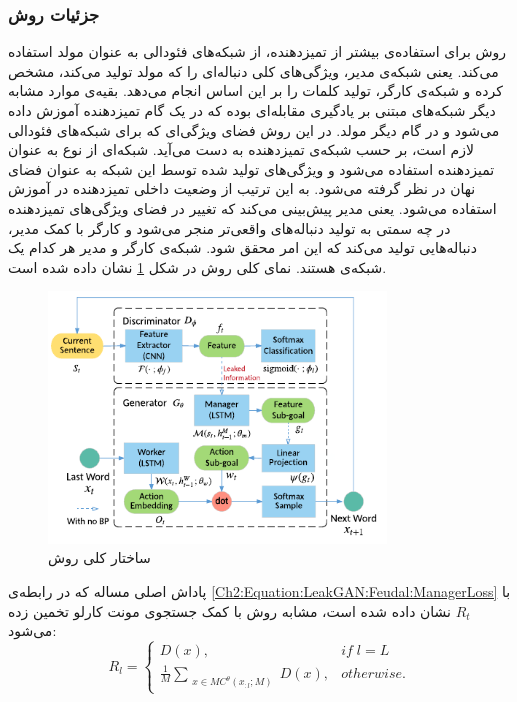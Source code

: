 \subsubsection{جزئیات روش}
روش
\cite{Guo2018}
برای استفاده‌ی بیشتر از تمیزدهنده، از شبکه‌های فئودالی به عنوان مولد استفاده می‌کند. یعنی شبکه‌ی مدیر، ویژگی‌های کلی دنباله‌ای را که مولد تولید می‌کند، مشخص کرده و شبکه‌ی کارگر، تولید کلمات را بر این اساس انجام می‌دهد.  بقیه‌ی موارد مشابه دیگر شبکه‌های مبتنی بر یادگیری مقابله‌ای بوده که در یک گام تمیزدهنده آموزش داده می‌شود و در گام دیگر مولد.
\newline
در این روش فضای ویژگی‌ای که برای شبکه‌های فئودالی لازم است، بر حسب شبکه‌ی تمیزدهنده به دست می‌آید. شبکه‌ای از نوع
به عنوان تمیزدهنده استفاده می‌شود  و ویژگی‌های تولید شده توسط این شبکه به عنوان فضای نهان در نظر گرفته می‌شود. به این ترتیب از وضعیت داخلی تمیزدهنده در آموزش استفاده می‌شود. یعنی مدیر پیش‌بینی می‌کند که تغییر در فضای ویژگی‌های تمیزدهنده در چه سمتی به تولید دنباله‌های واقعی‌تر منجر می‌شود و کارگر با کمک مدیر، دنباله‌هایی تولید می‌کند که این امر محقق شود.
شبکه‌ی کارگر و مدیر هر کدام یک شبکه‌ی 
هستند.
نمای کلی روش در شکل
\ref{Figure:LeakGAN:Architecture}
نشان داده شده است.
  \begin{figure}[!htb]
  	\centering
  	\includegraphics[width=0.8\textwidth]{images/ArchitectureLeakGAN.pdf} 
  	\caption[ساختار کلی روش 
  	]{
  		ساختار کلی روش 
  		\cite{Guo2018}
  	}
  	\label{Figure:LeakGAN:Architecture}
  \end{figure}
  \newline
پاداش اصلی مساله که در رابطه‌ی 
\ref{Ch2:Equation:LeakGAN:Feudal:ManagerLoss}
با
$R_t$
نشان داده شده است، مشابه روش
با کمک جستجوی مونت کارلو تخمین زده می‌شود:
 \begin{equation}\label{Ch2:Eqauation:Method:LeakGAN:RewardDefine}
R_l = 
 \begin{cases}
 D(x)  ,&   if \; l = L\\
 \frac{1}{M} \sum_{\substack{x \in MC^{\theta}(x_{:l}; M)}}D(x) ,&  otherwise .
 \end{cases}
 \end{equation}
